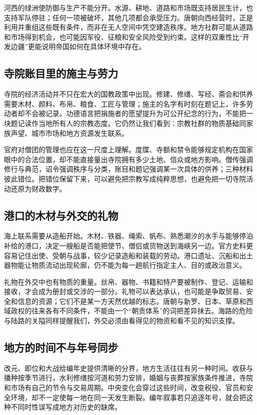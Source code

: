 河西的绿洲使防御与生产不能分开。水源、耕地、道路和市场既支持居民生计，也支持军队停驻；任何一项被破坏，其他几项都会承受压力。唐朝向西经营时，正是利用并重组这些既有条件，而非在无人空间中凭空建造秩序。地方社群可能从道路和市场得到机会，也可能因军役、征粮和安全风险受到约束。这样的双重性比“开发边疆”更能说明帝国如何在具体环境中存在。

\subsection{寺院账目里的施主与劳力}
寺院的经济活动并不只在宏大的国教政策中出现。修建、修缮、写经、斋会和供养需要木材、颜料、布帛、粮食、工匠与管理；施主的名字有时刻在题记上，许多劳动者却不会被记录。功德语言把捐施者的愿望提升为可公开纪念的行为，不能把一块题记读作当地所有人的宗教态度。它仍然让我们看到：宗教社群的物质基础同家族声望、城市市场和地方资源发生联系。

官府对僧团的管理也应在这一尺度上理解。度牒、寺额和禁令能够规定机构在国家眼中的合法位置，却不能直接量出寺院拥有多少土地、信众或地方影响。僧传强调修行与典范，诏令强调秩序与分类，账目和题记强调某一次具体的供养；三种材料彼此错位。把错位保留下来，可以避免把宗教写成纯粹思想，也避免把一切寺院活动还原为财政数字。

\subsection{港口的木材与外交的礼物}
海上联系需要从造船开始。木材、铁器、绳索、帆布、熟悉潮汐的水手与能够停泊补给的港口，决定一艘船是否能把使节、僧侣或货物送到海峡另一边。官方史料更容易记住出使、受朝与战事，较少记录造船和装载的劳动。港口遗址、沉船和出土器物能让物质流动出现轮廓，仍不能为每一趟航行指定主人、目的或政治意义。

礼物在外交中也有物质的重量。丝帛、器物、书籍和特产要被制作、登记、运输和接收，才会成为册封或交涉的一部分。礼物可以表达承认，也可能是争取贸易、安全和信息的资源；它们不是某一方天然优越的标志。唐朝与新罗、日本、草原和西域政权的往来各有不同条件，不能由一个“朝贡体系”的词把差异抹去。海路的危险与陆路的关隘同样提醒我们，外交必须由看得见的物资和看不见的知识支撑。

\subsection{地方的时间不与年号同步}
改元、即位和大战给编年史提供清晰的分界，地方生活往往有另一种时间。收获与播种按季节进行，水利修缮按河道和劳力安排，婚姻与丧葬按家族条件推进，寺院和市场有自己的节令与交易周期。中央变化会穿过这些时间，改变税役、官员和安全环境，却不一定使每一地在同一天发生断裂。编年叙事若只追逐年号，就会把这种不同时性误写成地方对历史的缺席。


